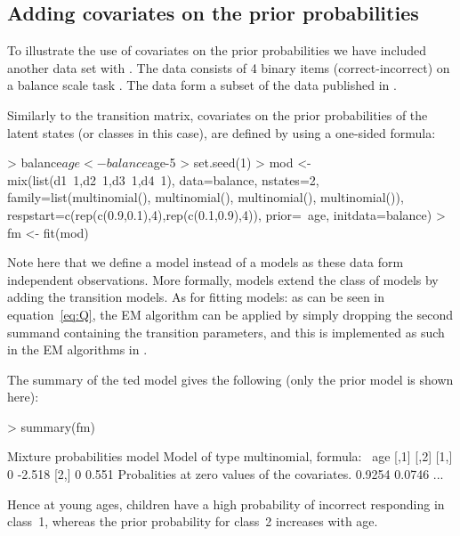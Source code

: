 \documentclass[article]{jss}
\begin{document}
\subsection{Adding covariates on the prior probabilities}

To illustrate the use of covariates on the prior probabilities we have
included another data set with .  The 
data consists of 4 binary items (correct-incorrect) on a balance scale
task \citet{Siegler1981}.  The data form a subset of the data
published in \citet{Jansen2002}.

Similarly to the transition matrix, covariates on the prior
probabilities of the latent states (or classes in this case), are
defined by using a one-sided formula:
\begin{CodeChunk}
\begin{CodeInput}
> balance$age <- balance$age-5
> set.seed(1)
> mod <- mix(list(d1~1,d2~1,d3~1,d4~1), data=balance, nstates=2,
    family=list(multinomial(), multinomial(), multinomial(),
    multinomial()), respstart=c(rep(c(0.9,0.1),4),rep(c(0.1,0.9),4)), 
    prior=~age, initdata=balance)
> fm <- fit(mod)
\end{CodeInput}
\end{CodeChunk}
Note here that we define a  model instead of a 
models as these data form independent observations.  More formally,
 models extend the class of  models by adding
the transition models.  As for fitting  models: as can be
seen in equation~\ref{eq:Q}, the EM algorithm can be applied by simply
dropping the second summand containing the transition parameters, and 
this is implemented as such in the EM algorithms in .

The summary of the ted model gives the following (only the
prior model is shown here):
\begin{CodeChunk}
\begin{CodeInput}
> summary(fm)
\end{CodeInput}
\begin{CodeOutput}
Mixture probabilities model 
Model of type multinomial, formula: ~age
     [,1]       [,2]
[1,]    0 -2.518
[2,]    0  0.551
Probalities at zero values of the covariates.
0.9254 0.0746
...
\end{CodeOutput}
\end{CodeChunk}	
Hence at young ages, children have a high probability of incorrect 
responding in class~1, whereas the prior probability for class~2 
increases with age. 
\end{document}
